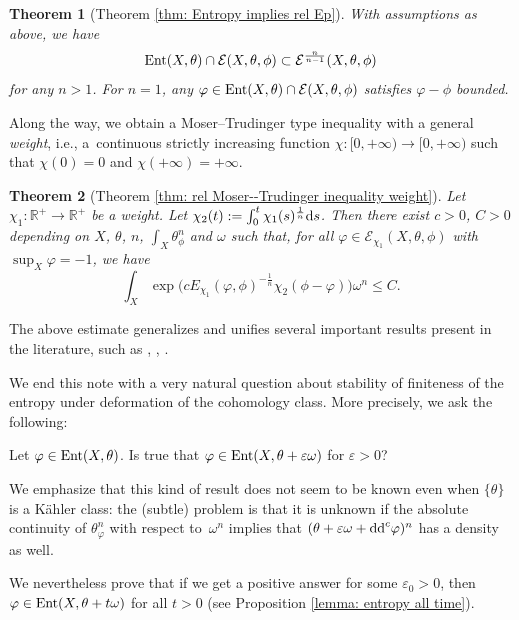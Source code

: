 \documentclass[pdftex]{sigma}
\numberwithin{equation}{section}
\theoremstyle{plain}
\newtheorem{bigthm}{Theorem}
\newcommand{\R}{\mathbb R}
\newcommand \Ent{{\rm Ent}}
\begin{document}
\begin{bigthm}[Theorem \ref{thm: Entropy implies rel Ep}]
 With assumptions as above, we have
 \[\Ent(X,\theta)\cap \mathcal{E}(X,\theta,\phi) \subset \mathcal{E}^{\frac{n}{n-1}}(X,\theta, \phi) \]
 for any $n>1$. For $n=1$, any $\varphi\in \Ent(X,\theta)\cap \mathcal{E}(X,\theta,\phi)$ satisfies $\varphi-\phi$ bounded.
\end{bigthm}

 Along the way, we obtain a Moser--Trudinger type inequality with a general \emph{weight}, i.e., a~continuous strictly increasing function $\chi\colon [0,+\infty)\to [0,+\infty)$ such that $\chi(0)=0$ and ${\chi(+\infty)=+\infty}$.

\begin{bigthm}[Theorem \ref{thm: rel Moser--Trudinger inequality weight}]
Let $\chi_1\colon\R^+\rightarrow \R^+ $ be a weight. Let $\chi_2(t) := \int_0^t \chi_1(s)^{\frac{1}{n}} {\rm d}s$. Then there exist $c>0$, $C>0$ depending on $X$, $\theta$, $n$, $\int_X \theta_\phi^n$ and $\omega$ such that, for all $\varphi\in \mathcal{E}_{\chi_1}(X,\theta, \phi)$ with $\sup_X \varphi=-1$, we have
\[
 	\int_X \exp \big( c E_{\chi_1}(\varphi, \phi)^{-\frac{1}{n}} \chi_2(\phi-\varphi)\big)\omega^n \leq C.
\]
\end{bigthm}

The above estimate generalizes and unifies several important results present in the literature, such as \cite[Theorem 1.1]{BB11}, \cite[Theorem 2.1]{DGL20}, \cite[Theorem~2.11]{DNL21}.

 We end this note with a very natural question about stability of finiteness of the entropy under deformation of the cohomology class. More precisely, we ask the following:

\begin{Question} Let $\varphi \in \Ent(X, \theta)$. Is true that $\varphi \in \Ent(X, \theta+\varepsilon \omega)$ for $\varepsilon>0$?
\end{Question}

We emphasize that this kind of result does not seem to be known even when $\{\theta\}$ is a K\"ahler class: the (subtle) problem is that it is unknown if the absolute continuity of $\theta_\varphi^n $ with respect to~$\omega^n$ implies that $(\theta+\varepsilon \omega+{\rm dd}^c \varphi)^n $ has a density as well.

We nevertheless prove that if we get a positive answer for some $\varepsilon_0>0$, then $\varphi \in \Ent(X, \theta+t\omega)$ for all $t>0$ (see Proposition \ref{lemma: entropy all time}).
\end{document}
